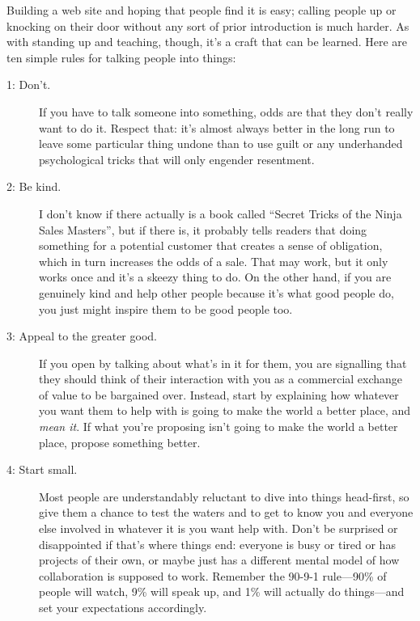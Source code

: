 Building a web site and hoping that people find it is easy;
calling people up or knocking on their door without any sort of prior introduction
is much harder.
As with standing up and teaching,
though,
it's a craft that can be learned.
Here are ten simple rules for talking people into things:

\begin{description}

\item[1: Don't.]
  If you have to talk someone into something,
  odds are that they don't really want to do it.
  Respect that:
  it's almost always better in the long run to leave some particular thing undone
  than to use guilt or any underhanded psychological tricks that will only engender resentment.

\item[2: Be kind.]
  I don't know if there actually is a book called
  ``Secret Tricks of the Ninja Sales Masters'',
  but if there is,
  it probably tells readers that doing something for a potential customer
  that creates a sense of obligation,
  which in turn increases the odds of a sale.
  That may work, but it only works once and it's a skeezy thing to do.
  On the other hand,
  if you are genuinely kind
  and help other people because it's what good people do,
  you just might inspire them to be good people too.

\item[3: Appeal to the greater good.]
  If you open by talking about what's in it for them,
  you are signalling that they should think of their interaction with you
  as a commercial exchange of value to be bargained over.
  Instead,
  start by explaining how whatever you want them to help with is going to make the world a better place,
  and \emph{mean it}.
  If what you're proposing isn't going to make the world a better place,
  propose something better.

\item[4: Start small.]
  Most people are understandably reluctant to dive into things head-first,
  so give them a chance to test the waters
  and to get to know you and everyone else involved in
  whatever it is you want help with.
  Don't be surprised or disappointed if that's where things end:
  everyone is busy or tired or has projects of their own,
  or maybe just has a different mental model of how collaboration is supposed to work.
  Remember the 90-9-1 rule---90\% of people will watch,
  9\% will speak up,
  and 1\% will actually do things---and set your expectations accordingly.


\end{description}
